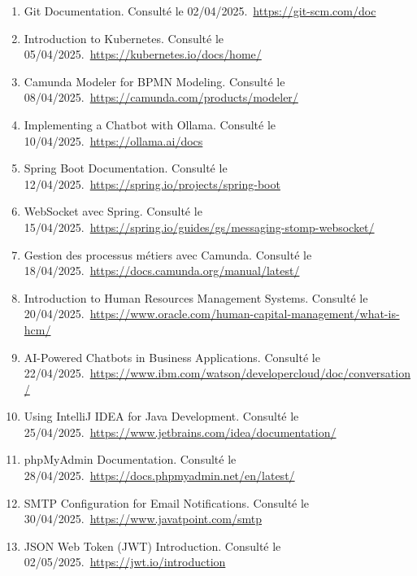 \begin{enumerate}
\item[ref12] Git Documentation. Consulté le 02/04/2025.\
\url{https://git-scm.com/doc}

\item[ref13] Introduction to Kubernetes. Consulté le 05/04/2025.\
\url{https://kubernetes.io/docs/home/}

\item[ref14] Camunda Modeler for BPMN Modeling. Consulté le 08/04/2025.\
\url{https://camunda.com/products/modeler/}

\item[ref15] Implementing a Chatbot with Ollama. Consulté le 10/04/2025.\
\url{https://ollama.ai/docs}

\item[ref16] Spring Boot Documentation. Consulté le 12/04/2025.\
\url{https://spring.io/projects/spring-boot}

\item[ref17] WebSocket avec Spring. Consulté le 15/04/2025.\
\url{https://spring.io/guides/gs/messaging-stomp-websocket/}

\item[ref18] Gestion des processus métiers avec Camunda. Consulté le 18/04/2025.\
\url{https://docs.camunda.org/manual/latest/}

\item[ref19] Introduction to Human Resources Management Systems. Consulté le 20/04/2025.\
\url{https://www.oracle.com/human-capital-management/what-is-hcm/}

\item[ref20] AI-Powered Chatbots in Business Applications. Consulté le 22/04/2025.\
\url{https://www.ibm.com/watson/developercloud/doc/conversation/}

\item[ref21] Using IntelliJ IDEA for Java Development. Consulté le 25/04/2025.\
\url{https://www.jetbrains.com/idea/documentation/}

\item[ref22] phpMyAdmin Documentation. Consulté le 28/04/2025.\
\url{https://docs.phpmyadmin.net/en/latest/}

\item[ref23] SMTP Configuration for Email Notifications. Consulté le 30/04/2025.\
\url{https://www.javatpoint.com/smtp}

\item[ref24] JSON Web Token (JWT) Introduction. Consulté le 02/05/2025.\
\url{https://jwt.io/introduction}


\end{enumerate}

